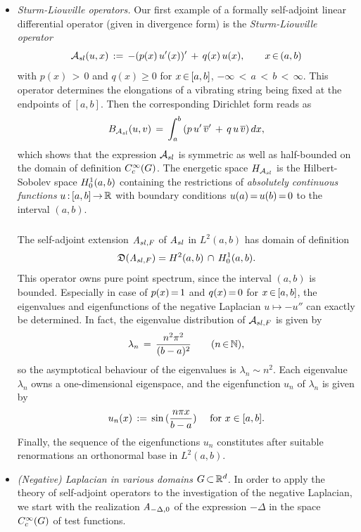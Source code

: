 \documentclass[11pt,twoside]{article}
\begin{document}
\begin{itemize}[leftmargin=17pt]
\item[(a)] \textit{Sturm-Liouville operators.}
Our first example of a formally self-adjoint linear differential operator
(given in divergence form) is the \textit{Sturm-Liouville} \textit{operator}
\[
{\mathcal{A}}_{sl}(u,x) \,:=\, -(p(x)\, u'(x))' \,+\, q(x)\, u(x),
\quad \quad x {\,\in\,} (a,b)
\]
with $p(x) {\,>\,} 0$ and $q(x) \geq 0$ for $x {\,\in\,} [a,b]$,
$-\infty {\,<\,} a {\,<\,} b {\,<\,} \infty$.
This operator determines the elongations of a vibrating string
being fixed at the endpoints of $[a,b]$.
Then the corresponding Dirichlet form reads as
\[
B_{{\mathcal{A}}_{sl}}(u,v) \,=\,
\int_a^b \,
(p \, u'\, \overline{v}' \,+\, q \, u \, \overline{v}) \, dx,
\]
which shows that the expression ${\mathcal{A}}_{sl}$ is symmetric as well as half-bounded
on the domain of definition $C_c^{\infty}(G)$.
The energetic space $H_{{\mathcal{A}}_{sl}}$ is the Hilbert-Sobolev space $H_0^{1}(a,b)$
containing the restrictions of 
\textit{absolutely continuous functions} $u{\,:\,} [a,b] {\,\to\,} {\mathbb{R}}$
with boundary conditions $u(a) {\,=\,} u(b) {\,=\,} 0$ to the interval $(a,b)$.

\subparagraph{}
The self-adjoint extension $\mathit{A}_{sl,F}$ of $\mathit{A}_{sl}$ in $L^2(a,b)$
has domain of definition
\[
\mathfrak{D}(\mathit{A}_{sl,F}) = H^2(a,b) \, \cap \, H_0^{1}(a,b).
\]
This operator owns pure point spectrum,
since the interval $(a,b)$ is bounded.
Especially in case of $p(x) {\,=\,} 1$ and $q(x) {\,=\,} 0$ for $x {\,\in\,} [a,b]$, 
the eigen\-values and eigen\-functions
of the negative Laplacian $u \mapsto -u''$ can exactly be determined.
In fact,
the eigenvalue distribution of ${\mathcal{A}}_{sl,F}$ is given by
\[
\lambda_n \,=\, \frac{n^2 \pi^2}{(b-a)^2} \quad \quad (n {\,\in\,} {\mathbb{N}}),
\]
so the asymptotical behaviour of the eigen\-values is $\lambda_n \sim n^2$.
Each eigen\-value $\lambda_n$ owns a one-dimensional eigen\-space,
and the eigen\-function $u_n$ of $\lambda_n$ is given by
\[
u_n(x) \,:=\, \sin \, (\frac{n \pi x}{b-a}) \quad \mbox{ for } x \in [a,b].
\]
Finally,
the sequence of the eigen\-functions $u_n$
constitutes after suitable renormations an ortho\-normal base in $L^2(a,b)$.

\item[(b)] \textit{(Negative) Laplacian in various domains $G {\,\subset\,} {\mathbb{R}}^d$.}
In order to apply the theory of self-adjoint operators
to the investigation of the negative Laplacian,
we start with the realization $\mathit{A}_{-\Delta,0}$ of the expression $-\Delta$
in the space $C_c^{\infty}(G)$ of test functions.


\end{itemize}
\end{document}
